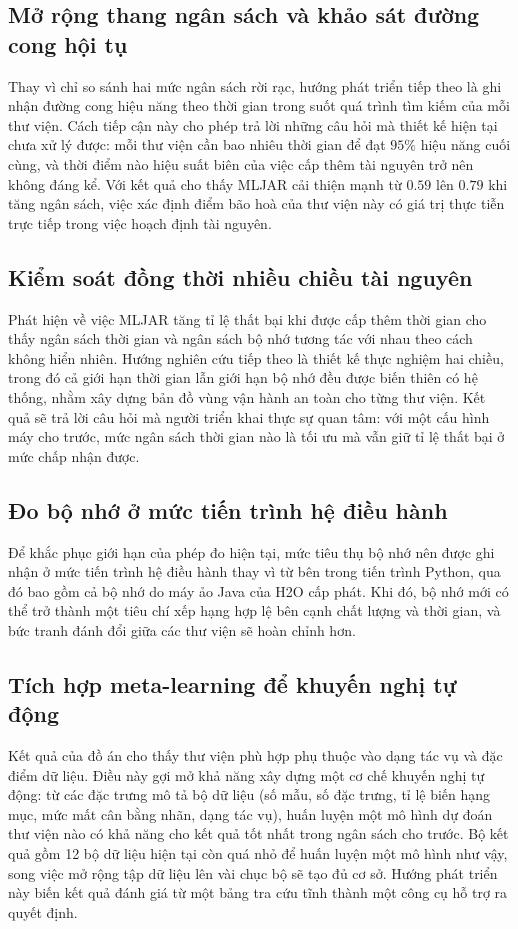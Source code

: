 \subsection{Mở rộng thang ngân sách và khảo sát đường cong hội tụ}
Thay vì chỉ so sánh hai mức ngân sách rời rạc, hướng phát triển tiếp theo là ghi
nhận đường cong hiệu năng theo thời gian trong suốt quá trình tìm kiếm của mỗi thư
viện. Cách tiếp cận này cho phép trả lời những câu hỏi mà thiết kế hiện tại chưa
xử lý được: mỗi thư viện cần bao nhiêu thời gian để đạt $95\%$ hiệu năng cuối
cùng, và thời điểm nào hiệu suất biên của việc cấp thêm tài nguyên trở nên không
đáng kể. Với kết quả cho thấy MLJAR cải thiện mạnh từ $0.59$ lên $0.79$ khi tăng
ngân sách, việc xác định điểm bão hoà của thư viện này có giá trị thực tiễn trực
tiếp trong việc hoạch định tài nguyên.

\subsection{Kiểm soát đồng thời nhiều chiều tài nguyên}
Phát hiện về việc MLJAR tăng tỉ lệ thất bại khi được cấp thêm thời gian cho thấy
ngân sách thời gian và ngân sách bộ nhớ tương tác với nhau theo cách không hiển
nhiên. Hướng nghiên cứu tiếp theo là thiết kế thực nghiệm hai chiều, trong đó cả
giới hạn thời gian lẫn giới hạn bộ nhớ đều được biến thiên có hệ thống, nhằm xây
dựng bản đồ vùng vận hành an toàn cho từng thư viện. Kết quả sẽ trả lời câu hỏi
mà người triển khai thực sự quan tâm: với một cấu hình máy cho trước, mức ngân
sách thời gian nào là tối ưu mà vẫn giữ tỉ lệ thất bại ở mức chấp nhận được.

\subsection{Đo bộ nhớ ở mức tiến trình hệ điều hành}
Để khắc phục giới hạn của phép đo hiện tại, mức tiêu thụ bộ nhớ nên được ghi nhận
ở mức tiến trình hệ điều hành thay vì từ bên trong tiến trình Python, qua đó bao
gồm cả bộ nhớ do máy ảo Java của H2O cấp phát. Khi đó, bộ nhớ mới có thể trở thành
một tiêu chí xếp hạng hợp lệ bên cạnh chất lượng và thời gian, và bức tranh đánh
đổi giữa các thư viện sẽ hoàn chỉnh hơn.

\subsection{Tích hợp meta-learning để khuyến nghị tự động}
Kết quả của đồ án cho thấy thư viện phù hợp phụ thuộc vào dạng tác vụ và đặc điểm
dữ liệu. Điều này gợi mở khả năng xây dựng một cơ chế khuyến nghị tự động: từ các
đặc trưng mô tả bộ dữ liệu (số mẫu, số đặc trưng, tỉ lệ biến hạng mục, mức mất cân
bằng nhãn, dạng tác vụ), huấn luyện một mô hình dự đoán thư viện nào có khả năng
cho kết quả tốt nhất trong ngân sách cho trước. Bộ kết quả gồm 12 bộ dữ liệu hiện
tại còn quá nhỏ để huấn luyện một mô hình như vậy, song việc mở rộng tập dữ liệu
lên vài chục bộ sẽ tạo đủ cơ sở. Hướng phát triển này biến kết quả đánh giá từ một
bảng tra cứu tĩnh thành một công cụ hỗ trợ ra quyết định.

